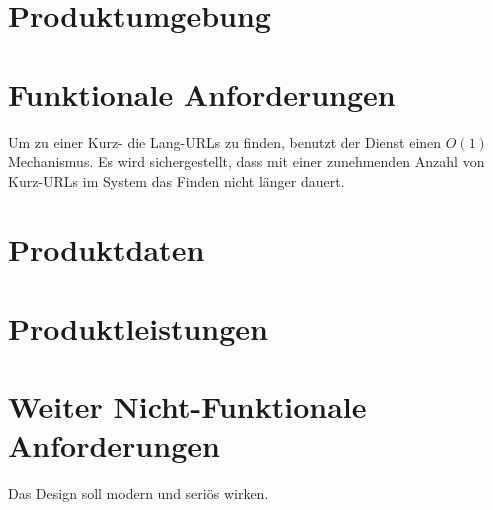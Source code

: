 \documentclass[parskip=full,11pt,twoside]{scrartcl}
\begin{document}
\section{Produktumgebung}

\section{Funktionale Anforderungen}

Um zu einer Kurz- die Lang-URLs zu finden,
benutzt der Dienst einen $O(1)$ Mechanismus.
Es wird sichergestellt,
dass mit einer zunehmenden Anzahl von Kurz-URLs im System
das Finden nicht länger dauert.

\section{Produktdaten}

\section{Produktleistungen}


\section{Weiter Nicht-Funktionale Anforderungen}


Das Design soll modern und seriös wirken.
\end{document}
